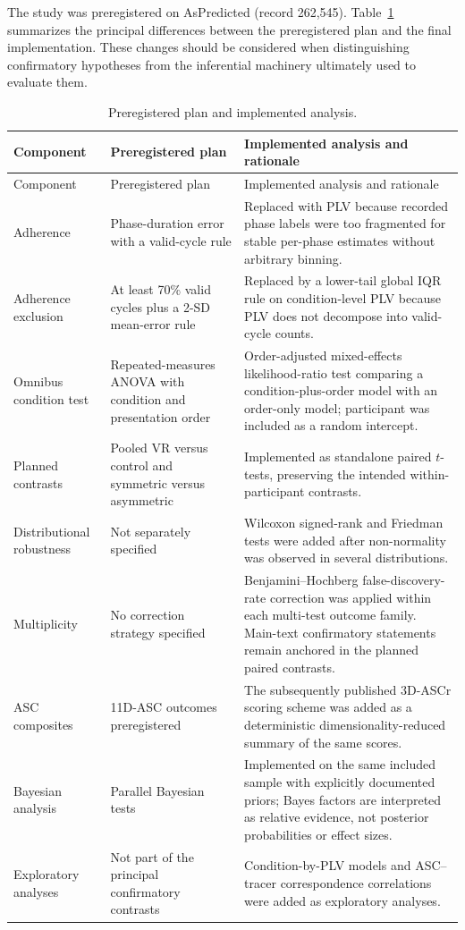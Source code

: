 \documentclass[pdflatex,sn-mathphys-num]{sn-jnl}
\begin{document}
The study was preregistered on AsPredicted (record 262,545). Table~\ref{tab:s_deviations} summarizes the principal differences between the preregistered plan and the final implementation. These changes should be considered when distinguishing confirmatory hypotheses from the inferential machinery ultimately used to evaluate them.

\begin{longtable}{p{}p{}p{}}
\caption{Preregistered plan and implemented analysis.}\label{tab:s_deviations}\\
\toprule
Component & Preregistered plan & Implemented analysis and rationale \\
\midrule
\endfirsthead
\toprule
Component & Preregistered plan & Implemented analysis and rationale \\
\midrule
\endhead
Adherence & Phase-duration error with a valid-cycle rule & Replaced with PLV because recorded phase labels were too fragmented for stable per-phase estimates without arbitrary binning. \\
Adherence exclusion & At least 70\% valid cycles plus a 2-SD mean-error rule & Replaced by a lower-tail global IQR rule on condition-level PLV because PLV does not decompose into valid-cycle counts. \\
Omnibus condition test & Repeated-measures ANOVA with condition and presentation order & Order-adjusted mixed-effects likelihood-ratio test comparing a condition-plus-order model with an order-only model; participant was included as a random intercept. \\
Planned contrasts & Pooled VR versus control and symmetric versus asymmetric & Implemented as standalone paired $t$-tests, preserving the intended within-participant contrasts. \\
Distributional robustness & Not separately specified & Wilcoxon signed-rank and Friedman tests were added after non-normality was observed in several distributions. \\
Multiplicity & No correction strategy specified & Benjamini--Hochberg false-discovery-rate correction was applied within each multi-test outcome family. Main-text confirmatory statements remain anchored in the planned paired contrasts. \\
ASC composites & 11D-ASC outcomes preregistered & The subsequently published 3D-ASCr scoring scheme was added as a deterministic dimensionality-reduced summary of the same scores. \\
Bayesian analysis & Parallel Bayesian tests & Implemented on the same included sample with explicitly documented priors; Bayes factors are interpreted as relative evidence, not posterior probabilities or effect sizes. \\
Exploratory analyses & Not part of the principal confirmatory contrasts & Condition-by-PLV models and ASC--tracer correspondence correlations were added as exploratory analyses. \\
\bottomrule
\end{longtable}
\end{document}
